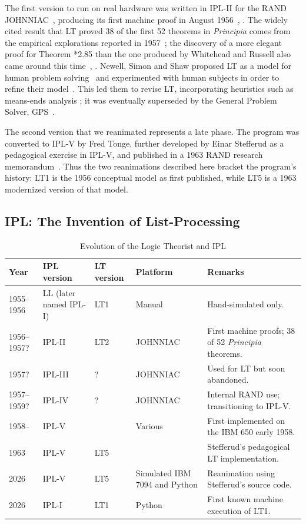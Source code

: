 \documentclass[journal]{IEEEtran}
\begin{document}
The first version to run on real hardware was written in IPL-II for
the RAND JOHNNIAC~\cite{newellshaw1957},
producing its first machine proof in August
1956~\cite[Ch.~13]{simon1996models}, \cite{newellshaw1957}. The widely cited result
that LT proved 38 of the first 52 theorems in \textit{Principia} comes 
from the empirical explorations reported in 1957~\cite{LT1957};
the discovery of a more elegant proof for Theorem *2.85 than the 
one produced by Whitehead and Russell also came around this 
time~\cite[Ch.~13]{simon1996models}, \cite{cip8jan1958}.
Newell, Simon and Shaw proposed LT as a model 
for human problem solving~\cite{HPS1958}
and experimented with human subjects in order to refine
their model~\cite{PCT1959}.  This led them to revise
LT, incorporating heuristics such as means-ends
analysis \cite{PCT1959}; it was eventually
superseded by the General Problem Solver,
GPS~\cite[p.~19]{SHT1959}.

The second version that we reanimated represents a late phase.
The program was converted to IPL-V by Fred Tonge, further developed
by Einar Stefferud as a pedagogical exercise in IPL-V, and published
in a 1963 RAND research memorandum~\cite[Section~I]{stefferud1963lt}.
Thus the two reanimations described here bracket the program's
history: LT1 is the 1956 conceptual model as first published, while
LT5 is a 1963 modernized version of that model.

\subsection{IPL: The Invention of List-Processing}

\begin{table}[h]
\centering
\caption{Evolution of the Logic Theorist and IPL}
\label{tab:lt_versions}
\begin{tabular}{@{}lllll@{}}
\toprule
\textbf{Year} & \textbf{IPL version} & \textbf{LT version} & \textbf{Platform} & \textbf{Remarks} \\ \midrule
1955--1956 & LL (later named IPL-I) & LT1 & Manual & Hand-simulated only. \\
1956--1957? & IPL-II & LT2 & JOHNNIAC & First machine proofs; 38 of 52 \textit{Principia} theorems. \\
1957? & IPL-III & ? & JOHNNIAC & Used for LT but soon abandoned. \\
1957--1959? & IPL-IV & ? & JOHNNIAC & Internal RAND use; transitioning to IPL-V. \\
1958-- & IPL-V & \ & Various & First implemented on the IBM 650 early 1958. \\
1963 & IPL-V & LT5 & \ & Stefferud's pedagogical LT implementation. \\
2026 & IPL-V & LT5 & Simulated IBM 7094 and Python & Reanimation using Stefferud's source code. \\
2026 & IPL-I & LT1 & Python & First known machine execution of LT1. \\ \bottomrule
\end{tabular}
\end{table}
\end{document}
